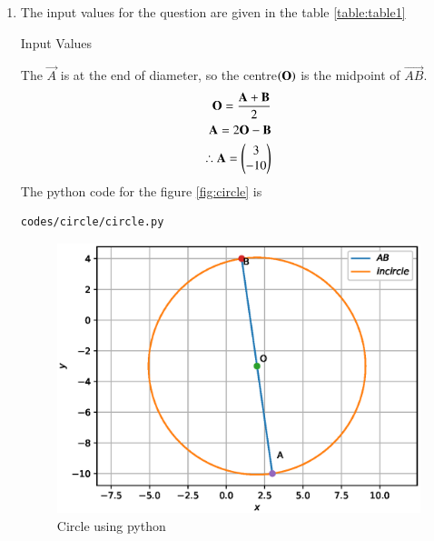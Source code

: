 \renewcommand{\theequation}{\theenumi}
\begin{enumerate}[label=\arabic*.,ref=\thesubsection.\theenumi]
 
\item The input values for the question are given in the table \eqref{table:table1}
\begin{table}[ht!]
\centering

\caption{Input Values}
\label{table:table1}	
\end{table}
The $\vec{A}$ is at the end of diameter, so the centre$\left(\mathbf{O}\right)$ is the midpoint of $\vec{AB}$.
\begin{align}
\mathbf{O}=\frac{\mathbf{A}+\mathbf{B}}{2}
\\
\mathbf{A}=2\mathbf{O}-\mathbf{B}
\\
\therefore \mathbf{A}=\begin{pmatrix}3\\-10\end{pmatrix}
\end{align}
The python code for the figure \eqref{fig:circle} is\begin{lstlisting}
codes/circle/circle.py
\end{lstlisting}
\begin{figure}[!ht]
\centering
\includegraphics[width=\columnwidth]{./figs/circle/circle.eps}
\caption{Circle using python}
\label{fig:circle}
\end{figure}

\end{enumerate}